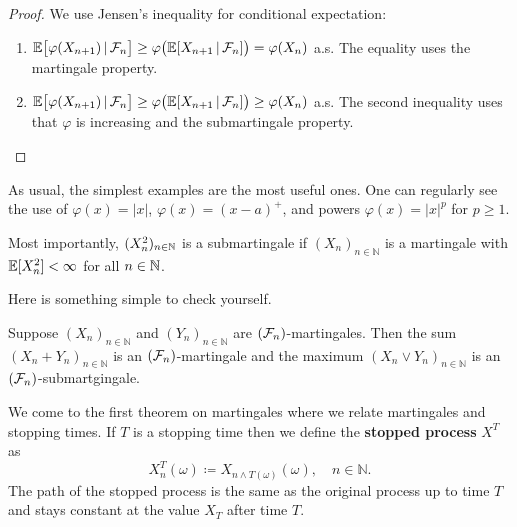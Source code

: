 \begin{proof}
	We use Jensen's inequality for conditional expectation:
	\begin{enumerate}[label=(\roman*)]
		\item
			$\mathbb{E} \big[\varphi(X_{n+1})\,|\,\mathcal{F}_n\big] \geq \varphi \big( \mathbb{E}[X_{n+1}\,|\,\mathcal{F}_n]\big) = \varphi(X_n)$ a.s. The equality uses the martingale property.
		\item
			$\mathbb{E} \big[\varphi(X_{n+1})\,|\,\mathcal{F}_n\big] \geq \varphi \big( \mathbb{E}[X_{n+1}\,|\,\mathcal{F}_n]\big) \geq \varphi (X_n)$ a.s. The second inequality uses that $\varphi$ is increasing and the submartingale property.
	\end{enumerate}
\end{proof}
As usual, the simplest examples are the most useful ones. One can regularly see the use of $\varphi (x) = \left| x \right|$, $\varphi (x) = (x-a)^+ $, and powers $\varphi (x) = \left| x \right|^p$ for $p \geq 1$.
\begin{lwarnhinweis}
	Most importantly, $(X_n^2)_{n\in\mathbb{N}}$ is a submartingale if $(X_n)_{n\in\mathbb{N}}$ is a martingale with $\mathbb{E}[X_n^2]<\infty$ for all $n\in\mathbb{N}$.
\end{lwarnhinweis}
Here is something simple to check yourself. 
\begin{luebung}
	Suppose $(X_n)_{n\in\mathbb{N}}$ and $(Y_n)_{n\in\mathbb{N}}$ are $(\mathcal{F}_n)$-martingales.
	Then the sum $(X_n+Y_n)_{n\in\mathbb{N}}$ is an $(\mathcal{F}_n)$-martingale and the maximum $(X_n \vee Y_n)_{n\in\mathbb{N}}$ is an $(\mathcal{F}_n)$-submartgingale.
\end{luebung}
We come to the first theorem on martingales where we relate martingales and stopping times. If $T$ is a stopping time then we define the \textbf{stopped process} $X^T$ as $$X_n^T(\omega)\coloneqq X_{n \wedge T(\omega)}(\omega),\quad n \in \mathbb{N}.$$ The path of the stopped process is the same as the original process up to time $T$ and stays constant at the value $X_T$ after time $T$. 
